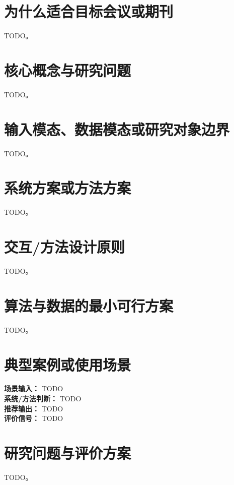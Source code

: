 \documentclass[UTF8,a4paper,11pt]{ctexart}
\begin{document}
\section{为什么适合目标会议或期刊}

TODO。

\section{核心概念与研究问题}

TODO。

\section{输入模态、数据模态或研究对象边界}

TODO。

\section{系统方案或方法方案}

TODO。

\section{交互/方法设计原则}

TODO。

\section{算法与数据的最小可行方案}

TODO。

\section{典型案例或使用场景}

\begin{tcolorbox}[mybox,title=Demo Case]
\textbf{场景输入：} TODO\\
\textbf{系统/方法判断：} TODO\\
\textbf{推荐输出：} TODO\\
\textbf{评价信号：} TODO
\end{tcolorbox}

\section{研究问题与评价方案}

TODO。
\end{document}
